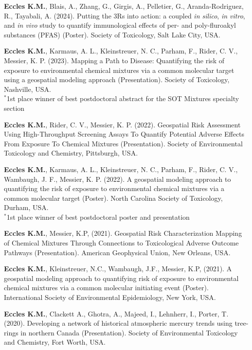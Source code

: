 \documentclass[margin,line]{res}
\begin{document}
\begin{resume}
\textbf{Eccles K.M.}, Blais, A., Zhang, G., Girgis, A., Pelletier, G., Aranda-Rodriguez, R., Tayabali, A. (2024). Putting the 3Rs into action: a coupled \textit{in silico}, \textit{in vitro}, and \textit{in vivo} study to quantify immunological effects of per- and poly-fluroakyl substances (PFAS) (Poster). Society of Toxicology, Salt Lake City, USA.

\textbf{Eccles K.M.}, Karmaus, A. L., Kleinstreuer, N. C., Parham, F., Rider, C. V., Messier, K. P. (2023). Mapping a Path to Disease: Quantifying the risk of exposure to environmental chemical mixtures via a common molecular target using a geospatial modeling approach (Presentation). Society of Toxicology, Nashville, USA.\\
$^{*}$1st place winner of best postdoctoral abstract for the SOT Mixtures specialty section

\textbf{Eccles K.M.}, Rider, C. V., Messier, K. P. (2022). Geospatial Risk Assessment Using High-Throughput Screening Assays To Quantify Potential Adverse Effects From Exposure To Chemical Mixtures (Presentation). Society of Environmental Toxicology and Chemistry, Pittsburgh, USA.

\textbf{Eccles K.M.}, Karmaus, A. L., Kleinstreuer, N. C., Parham, F., Rider, C. V., Wambaugh, J. F., Messier, K. P. (2022). A geospatial modeling approach to quantifying the risk of exposure to environmental chemical mixtures via a common molecular target (Poster). North Carolina Society of Toxicology, Durham, USA.\\
$^{*}$1st place winner of best postdoctoral poster and presentation

\textbf{Eccles K.M.}, Messier, K.P, (2021). Geospatial Risk Characterization Mapping of Chemical Mixtures Through Connections to Toxicological Adverse Outcome Pathways (Presentation). American Geophysical Union, New Orleans, USA.

\textbf{Eccles K.M.}, Kleinstreuer, N.C., Wambaugh, J.F., Messier, K.P, (2021). A geospatial modeling approach to quantifying risk of exposure to environmental chemical mixtures via a common molecular initiating event (Poster). International Society of Environmental Epidemiology, New York, USA.

\textbf{Eccles K.M.}, Clackett A., Ghotra, A., Majeed, I., Lehnherr, I., Porter, T. (2020). Developing a network of historical atmospheric mercury trends using tree-rings in northern Canada (Presentation).  Society of Environmental Toxicology and Chemistry, Fort Worth, USA.


\end{resume}
\end{document}
